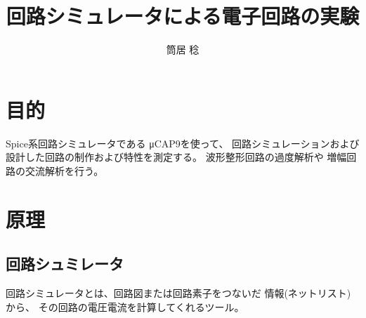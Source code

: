 \documentclass{jsarticle}
\begin{document}

\lhead{}
\chead{}

\title{回路シミュレータによる電子回路の実験}
\author{筒居 稔}
\maketitle

\section{目的}
Spice系回路シミュレータである
μCAP9を使って、
回路シミュレーションおよび
設計した回路の制作および特性を測定する。
波形整形回路の過度解析や
増幅回路の交流解析を行う。
\section{原理}
\subsection{回路シュミレータ}
回路シミュレータとは、回路図または回路素子をつないだ
情報(ネットリスト)から、
その回路の電圧電流を計算してくれるツール。

\end{document}
